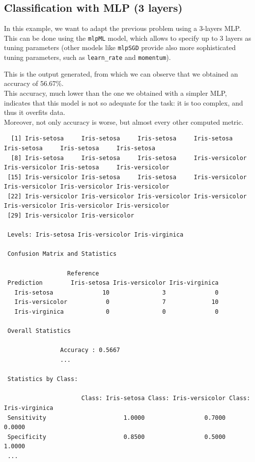 \documentclass{article}
\begin{document}
\pagebreak

\subsection{Classification with MLP (3 layers)}
In this example, we want to adapt the previous problem using a 3-layers MLP.\\

This can be done using the \texttt{mlpML} model, which allows to specify up to 3 layers as tuning parameters (other models like \texttt{mlpSGD} provide also more sophisticated tuning parameters, such as \texttt{learn\_rate} and \texttt{momentum}).\\



\pagebreak

This is the output generated, from which we can observe that we obtained an accuracy of 56.67\%.\\

This accuracy, much lower than the one we obtained with a simpler MLP, indicates that this model is not so adequate for the task: it is too complex, and thus it overfits data.\\

Moreover, not only accuracy is worse, but almost every other computed metric.\\

\begin{lstlisting}
  [1] Iris-setosa     Iris-setosa     Iris-setosa     Iris-setosa     Iris-setosa     Iris-setosa     Iris-setosa    
  [8] Iris-setosa     Iris-setosa     Iris-setosa     Iris-versicolor Iris-versicolor Iris-setosa     Iris-versicolor
 [15] Iris-versicolor Iris-setosa     Iris-setosa     Iris-versicolor Iris-versicolor Iris-versicolor Iris-versicolor
 [22] Iris-versicolor Iris-versicolor Iris-versicolor Iris-versicolor Iris-versicolor Iris-versicolor Iris-versicolor
 [29] Iris-versicolor Iris-versicolor

 Levels: Iris-setosa Iris-versicolor Iris-virginica

 Confusion Matrix and Statistics
 
                  Reference
 Prediction        Iris-setosa Iris-versicolor Iris-virginica
   Iris-setosa              10               3              0
   Iris-versicolor           0               7             10
   Iris-virginica            0               0              0
 
 Overall Statistics
                                           
                Accuracy : 0.5667          
                ... 

 Statistics by Class:
 
                      Class: Iris-setosa Class: Iris-versicolor Class: Iris-virginica
 Sensitivity                      1.0000                 0.7000                0.0000
 Specificity                      0.8500                 0.5000                1.0000
 ...
\end{lstlisting}
\end{document}
